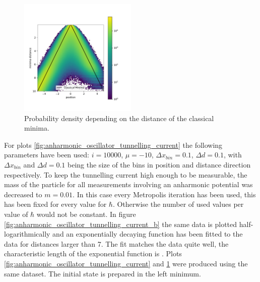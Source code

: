 \documentclass{scrartcl}
\begin{document}
		\begin{figure}[H]
			\centering
			\includegraphics[width=0.5\textwidth]{../imgs/anharmonic_oscillator_lambda_parameter/track_100001000_lambda_parameter.pdf}
			\caption{Probability density depending on the distance of the classical minima.}
			\label{fig:anharmonic_oscillator_lambda_parameter}
		\end{figure}
		For plots \ref{fig:anharmonic_oscillator_tunnelling_current} the following parameters have been used: $i=10000$, $\mu = -10$, $\Delta x_{bin} = 0.1$, $\Delta d = 0.1$, with $\Delta x_{bin}$ and $\Delta d = 0.1$ being the size of the bins in position and distance direction respectively.
		To keep the tunnelling current high enough to be measurable, the mass of the particle for all measurements involving an anharmonic potential was decreased to $m=0.01$.
		In this case every  Metropolis iteration has been used, this has been fixed for every value for $\hbar$.
		Otherwise the number of used values per value of $\hbar$ would not be constant.
		In figure \ref{fig:anharmonic_oscillator_tunnelling_current_b} the same data is plotted half-logarithmically and an exponentially decaying function has been fitted to the data for distances larger than 7.
		The fit matches the data quite well, the characteristic length of the exponential function is \unskip.
		Plots \ref{fig:anharmonic_oscillator_tunnelling_current} and \ref{fig:anharmonic_oscillator_lambda_parameter} were produced using the same dataset.
		The initial state is prepared in the left minimum.
\end{document}

